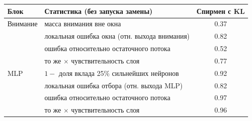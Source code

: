 \begin{tabular}{llc}
\toprule
Блок & Статистика (без запуска замены) & Спирмен с KL \\
\midrule
Внимание & масса внимания вне окна & 0.37 \\
 & локальная ошибка окна (отн. выхода внимания) & 0.82 \\
 & ошибка относительно остаточного потока & 0.52 \\
 & то же $\times$ чувствительность слоя & 0.77 \\
MLP & $1-$ доля вклада 25\% сильнейших нейронов & 0.92 \\
 & локальная ошибка отбора (отн. выхода MLP) & 0.82 \\
 & ошибка относительно остаточного потока & 0.97 \\
 & то же $\times$ чувствительность слоя & 0.96 \\
\bottomrule
\end{tabular}
